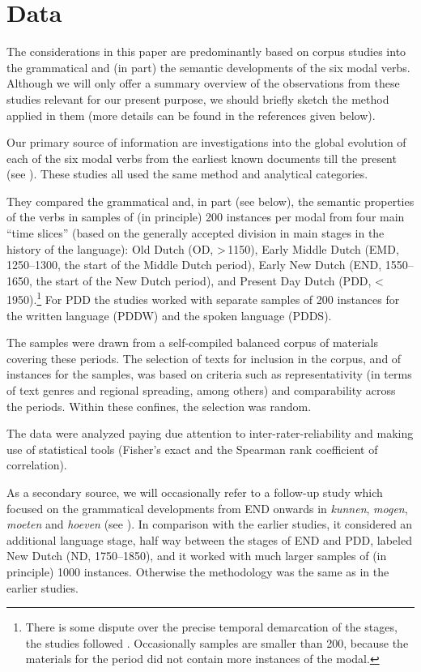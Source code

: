 \documentclass[output=paper]{langsci/langscibook}
\begin{document}
\section{Data} \label{nuyts:3}

The considerations in this paper are predominantly based on corpus studies into the grammatical and (in part) the semantic developments of the six modal verbs. Although we will only offer a summary overview of the observations from these studies relevant for our present purpose, we should briefly sketch the method applied in them (more details can be found in the references given below).

Our primary source of information are investigations into the global evolution of each of the six modal verbs from the earliest known documents till the present (see \citealt{Nuyts2013, BylooNuyts2014, NuytsByloo2015, NuytsEtAl2018, NuytsEtAlinPrep}). These studies all used the same method and analytical categories.

They compared the grammatical and, in part (see below), the semantic properties of the verbs in samples of (in principle) 200 instances per modal from four main “time slices” (based on the generally accepted division in main stages in the history of the language): Old Dutch (OD, >\,1150), Early Middle Dutch (EMD, 1250–1300, the start of the Middle Dutch period), Early New Dutch (END, 1550–1650, the start of the New Dutch period), and Present Day Dutch (PDD, <\,1950).\footnote{There is some dispute over the precise temporal demarcation of the stages, the studies followed \citet{vandenToorn1997}. Occasionally samples are smaller than 200, because the materials for the period did not contain more instances of the modal.} For PDD the studies worked with separate samples of 200 instances for the written language (PDDW) and the spoken language (PDDS).

The samples were drawn from a self-compiled balanced corpus of materials covering these periods. The selection of texts for inclusion in the corpus, and of instances for the samples, was based on criteria such as representativity (in terms of text genres and regional spreading, among others) and comparability across the periods. Within these confines, the selection was random.

The data were analyzed paying due attention to inter-rater-reliability and making use of statistical tools (Fisher's exact and the Spearman rank coefficient of correlation).

As a secondary source, we will occasionally refer to a follow-up study which focused on the grammatical developments from END onwards in \textit{kunnen}, \textit{mogen}, \textit{moeten} and \textit{hoeven} (see \citealt{CaersNuyts2021}). In comparison with the earlier studies, it considered an additional language stage, half way between the stages of END and PDD, labeled New Dutch (ND, 1750–1850), and it worked with much larger samples of (in principle) 1000 instances. Otherwise the methodology was the same as in the earlier studies.
\end{document}
